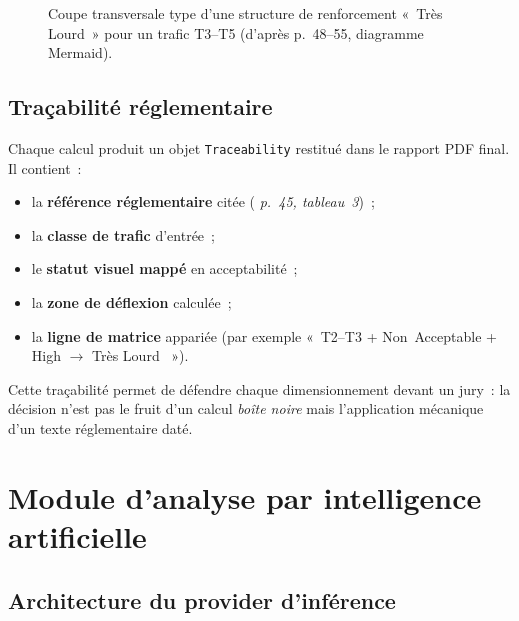 \begin{figure}[H]
  \caption{Coupe transversale type d'une structure de renforcement
  «~Très Lourd~» pour un trafic T3--T5 (d'après \cttp{} p.~48--55,
  diagramme Mermaid).}
  \label{fig:structure}
\end{figure}

\subsection{Traçabilité réglementaire}
\label{sec:tracabilite}

Chaque calcul produit un objet \texttt{Traceability} restitué dans le
rapport PDF final. Il contient~:

\begin{itemize}
  \item la \textbf{référence réglementaire} citée
        (\textit{\cttp{} p.~45, tableau~3})~;
  \item la \textbf{classe de trafic} d'entrée~;
  \item le \textbf{statut visuel mappé} en acceptabilité~;
  \item la \textbf{zone de déflexion} calculée~;
  \item la \textbf{ligne de matrice} appariée (par exemple
        «~T2--T3 + Non~Acceptable + High $\to$ Très Lourd~ »).
\end{itemize}

Cette traçabilité permet de défendre chaque dimensionnement devant un
jury~: la décision n'est pas le fruit d'un calcul \emph{boîte noire}
mais l'application mécanique d'un texte réglementaire daté.


\section{Module d'analyse par intelligence artificielle}
\label{sec:ia}

\subsection{Architecture du provider d'inférence}
\label{sec:provider}

